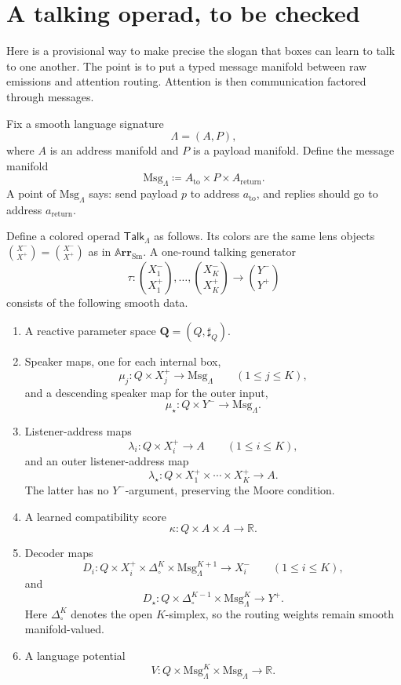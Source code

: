 \documentclass[11pt]{article}
\theoremstyle{plain}
\theoremstyle{definition}
\theoremstyle{remark}
\newcommand{\rr}{\mathbb{R}}
\newcommand{\Cat}[1]{\mathbf{#1}}
\newcommand{\Sm}{\mathrm{Sm}}
\newcommand{\arr}{\mathbb{A}\Cat{rr}}    %
\newcommand{\sarr}{\arr_{\Sm}}           %
\newcommand{\rv}[1]{\mathbf{#1}}         %
\newcommand{\sharpR}{\sharp}
\newcommand{\inpt}[1]{#1^{-}}
\newcommand{\outp}[1]{#1^{+}}
\newcommand{\lensob}[1]{\binom{\inpt{#1}}{\outp{#1}}}
\begin{document}
\section{A talking operad, to be checked}\label{sec.talk}

Here is a provisional way to make precise the slogan that boxes can
learn to talk to one another. The point is to put a typed message
manifold between raw emissions and attention routing. Attention is then
communication factored through messages.

Fix a smooth language signature
\[
  \Lambda=(A,P),
\]
where $A$ is an address manifold and $P$ is a payload manifold. Define
the message manifold
\[
  \mathrm{Msg}_{\Lambda}
    \coloneqq A_{\mathrm{to}}\times P\times A_{\mathrm{return}} .
\]
A point of $\mathrm{Msg}_{\Lambda}$ says: send payload $p$ to address
$a_{\mathrm{to}}$, and replies should go to address
$a_{\mathrm{return}}$.

Define a colored operad $\mathsf{Talk}_{\Lambda}$ as follows. Its colors
are the same lens objects $\lensob X=\binom{\inpt X}{\outp X}$ as in
$\sarr$. A one-round talking generator
\[
  \tau\colon \lensob{X_1},\ldots,\lensob{X_K}\longrightarrow\lensob Y
\]
consists of the following smooth data.

\begin{enumerate}
\item A reactive parameter space $\rv Q=(Q,\sharpR_Q)$.

\item Speaker maps, one for each internal box,
\[
  \mu_j\colon Q\times\outp{X_j}\longrightarrow \mathrm{Msg}_{\Lambda}
  \qquad(1\leq j\leq K),
\]
and a descending speaker map for the outer input,
\[
  \mu_\star\colon Q\times\inpt Y\longrightarrow\mathrm{Msg}_{\Lambda}.
\]

\item Listener-address maps
\[
  \lambda_i\colon Q\times\outp{X_i}\longrightarrow A
  \qquad(1\leq i\leq K),
\]
and an outer listener-address map
\[
  \lambda_\star\colon Q\times\outp{X_1}\times\cdots\times\outp{X_K}
    \longrightarrow A .
\]
The latter has no $\inpt Y$-argument, preserving the Moore condition.

\item A learned compatibility score
\[
  \kappa\colon Q\times A\times A\longrightarrow\rr .
\]

\item Decoder maps
\[
  D_i\colon
  Q\times\outp{X_i}\times\Delta^K_{\circ}
  \times\mathrm{Msg}_{\Lambda}^{K+1}
  \longrightarrow\inpt{X_i}
  \qquad(1\leq i\leq K),
\]
and
\[
  D_\star\colon
  Q\times\Delta^{K-1}_{\circ}\times\mathrm{Msg}_{\Lambda}^{K}
  \longrightarrow\outp Y .
\]
Here $\Delta^K_{\circ}$ denotes the open $K$-simplex, so the routing
weights remain smooth manifold-valued.

\item A language potential
\[
  V\colon Q\times\mathrm{Msg}_{\Lambda}^{K}\times\mathrm{Msg}_{\Lambda}
    \longrightarrow\rr .
\]
\end{enumerate}
\end{document}
